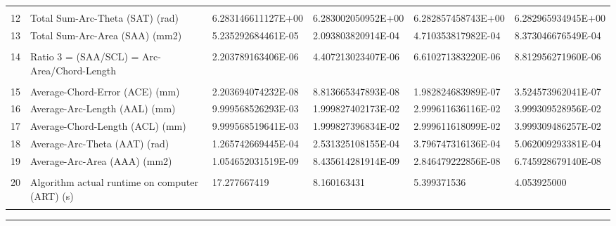 \begin{landscape}
\begin{table}[ht]
{\begin{tabular}{ p{0.2cm} p{8.80cm} p{4.00cm} p{4.0cm} p{4.00cm} p{4.0cm}}
&		&		&		&		&		\\
12	&	Total Sum-Arc-Theta (SAT) (rad)	&	6.283146611127E+00	&	6.283002050952E+00	&	6.282857458743E+00	&	6.282965934945E+00	\\
13	&	Total Sum-Arc-Area (SAA) (mm2)	&	5.235292684461E-05	&	2.093803820914E-04	&	4.710353817982E-04	&	8.373046676549E-04	\\
&		&		&		&		&		\\
14	&	Ratio 3 = (SAA/SCL) = Arc-Area/Chord-Length	&	2.203789163406E-06	&	4.407213023407E-06	&	6.610271383220E-06	&	8.812956271960E-06	\\
&		&		&		&		&		\\
15	&	Average-Chord-Error (ACE) (mm)	&	2.203694074232E-08	&	8.813665347893E-08	&	1.982824683989E-07	&	3.524573962041E-07	\\
16	&	Average-Arc-Length (AAL) (mm)	&	9.999568526293E-03	&	1.999827402173E-02	&	2.999611636116E-02	&	3.999309528956E-02	\\
17	&	Average-Chord-Length (ACL) (mm)	&	9.999568519641E-03	&	1.999827396834E-02	&	2.999611618099E-02	&	3.999309486257E-02	\\
18	&	Average-Arc-Theta (AAT) (rad)	&	1.265742669445E-04	&	2.531325108155E-04	&	3.796747316136E-04	&	5.062009293381E-04	\\
19	&	Average-Arc-Area (AAA) (mm2)	&	1.054652031519E-09	&	8.435614281914E-09	&	2.846479222856E-08	&	6.745928679140E-08	\\
&		&		&		&		&		\\
20	&	Algorithm actual runtime on computer (ART) (s) 	&	17.277667419	&	8.160163431	&	5.399371536	&	4.053925000	\\
&		&		&		&		&		

\end{tabular}

}   %
\hrule
\end{table}
\end{landscape}

